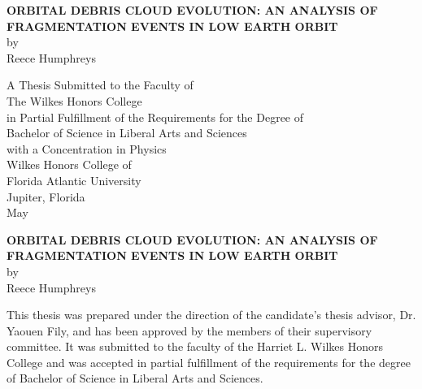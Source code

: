 \documentclass[a4paper, 12pt]{article}
\renewcommand{\arraystretch}{0.5} %
\begin{document}

\newcommand\ddfrac[2]{\frac{\displaystyle #1}{\displaystyle #2}}
\newcommand{\mytitle}{Orbital Debris Cloud Evolution: An analysis of fragmentation events in low earth orbit}
\newcommand{\myauthor}{Reece Humphreys}
\newcommand{\myadvisor}{Dr. Yaouen Fily}

\newcommand{\myskip}{\vspace{0.5in}}
\newcommand{\layouttitle}[1]{{\bf\large\MakeUppercase{#1}}}
\setlength{\parindent}{0em}
\doublespacing
\renewcommand{\arraystretch}{0.6} %
\thispagestyle{empty}

\begin{center}

	\vspace{4in} 
	\layouttitle{\mytitle} \\ by \\ \myauthor
	
	\vspace{1in}
	A Thesis Submitted to the Faculty of \\
	The Wilkes Honors College \\
	in Partial Fulfillment of the Requirements for the Degree of \\
	Bachelor of Science in Liberal Arts and Sciences \\
	with a Concentration in Physics \\ 
	\vspace{1in} 
	Wilkes Honors College of \\
	Florida Atlantic University \\
	Jupiter, Florida \\
	May \number\year

\end{center}

\newpage


\vspace{4in}
\begin{center}
	\layouttitle{\mytitle} \\
	by \\
	\myauthor
\end{center}

\singlespace
\vspace{1in}
This thesis was prepared under the direction of the candidate's thesis advisor, \myadvisor, and has been approved by the members of their supervisory committee. It was submitted to the faculty of the Harriet L. Wilkes Honors College and was accepted in partial fulfillment of the requirements for the degree of Bachelor of Science in Liberal Arts and Sciences.
\end{document}
